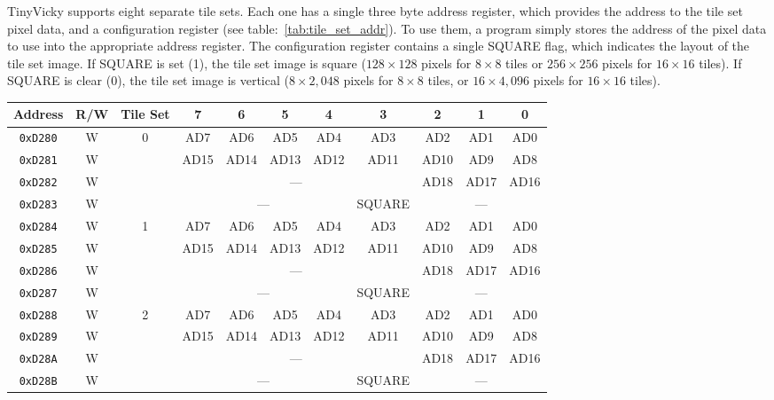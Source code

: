 TinyVicky supports eight separate tile sets. Each one has a single three byte address register, which provides the address to the tile set pixel data, and a configuration register (see table:~\ref{tab:tile_set_addr}). To use them, a program simply stores the address of the pixel data to use into the appropriate address register. The configuration register contains a single SQUARE flag, which indicates the layout of the tile set image. If SQUARE is set (1), the tile set image is square ($128 \times 128$ pixels for $8 \times 8$ tiles or $256 \times 256$ pixels for $16 \times 16$ tiles). If SQUARE is clear (0), the tile set image is vertical ($8 \times 2,048$ pixels for $8 \times 8$ tiles, or $16 \times 4,096$ pixels for $16 \times 16$ tiles).

\begin{table}[ht]
    \begin{center}
        \begin{tabular}{|c|c|c|c|c|c|c|c|c|c|c|} \hline
            Address & R/W & Tile Set & 7 & 6 & 5 & 4 & 3 & 2 & 1 & 0 \\ \hline\hline
            \verb+0xD280+ & W & \multirow{4}{*}{0} & AD7 & AD6 & AD5 & AD4 & AD3 & AD2 & AD1 & AD0 \\ \cline{1-2}\cline{4-11}
            \verb+0xD281+ & W &                    & AD15 & AD14 & AD13 & AD12 & AD11 & AD10 & AD9 & AD8 \\ \cline{1-2}\cline{4-11}
            \verb+0xD282+ & W &                    & \multicolumn{5}{|c|}{---} & AD18 & AD17 & AD16 \\ \cline{1-2}\cline{4-11}
            \verb+0xD283+ & W &                    & \multicolumn{4}{|c|}{---} & SQUARE & \multicolumn{3}{|c|}{---} \\ \hline\hline

            \verb+0xD284+ & W & \multirow{4}{*}{1} & AD7 & AD6 & AD5 & AD4 & AD3 & AD2 & AD1 & AD0 \\ \cline{1-2}\cline{4-11}
            \verb+0xD285+ & W &                    & AD15 & AD14 & AD13 & AD12 & AD11 & AD10 & AD9 & AD8 \\ \cline{1-2}\cline{4-11}
            \verb+0xD286+ & W &                    & \multicolumn{5}{|c|}{---} & AD18 & AD17 & AD16 \\ \cline{1-2}\cline{4-11}
            \verb+0xD287+ & W &                    & \multicolumn{4}{|c|}{---} & SQUARE & \multicolumn{3}{|c|}{---} \\ \hline\hline

            \verb+0xD288+ & W & \multirow{4}{*}{2} & AD7 & AD6 & AD5 & AD4 & AD3 & AD2 & AD1 & AD0 \\ \cline{1-2}\cline{4-11}
            \verb+0xD289+ & W &                    & AD15 & AD14 & AD13 & AD12 & AD11 & AD10 & AD9 & AD8 \\ \cline{1-2}\cline{4-11}
            \verb+0xD28A+ & W &                    & \multicolumn{5}{|c|}{---} & AD18 & AD17 & AD16 \\ \cline{1-2}\cline{4-11}
            \verb+0xD28B+ & W &                    & \multicolumn{4}{|c|}{---} & SQUARE & \multicolumn{3}{|c|}{---} \\ \hline\hline


\end{tabular}
\end{center}
\end{table}
